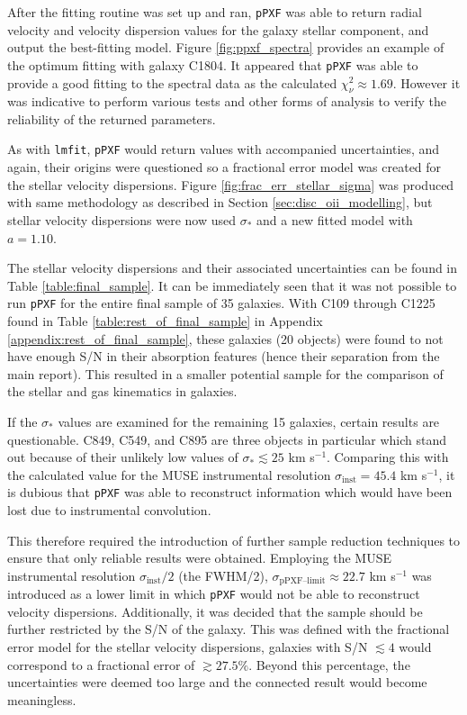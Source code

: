 \documentclass[12pt, twocolumn, nofootinbib]{revtex4-1}    %
\begin{document}
After the fitting routine was set up and ran, \texttt{pPXF} was able to return radial velocity and velocity dispersion values for the galaxy stellar component, and output the best-fitting model. Figure \ref{fig:ppxf_spectra} provides an example of the optimum fitting with galaxy C1804. It appeared that \texttt{pPXF} was able to provide a good fitting to the spectral data as the calculated $\chi^2_\nu\approx1.69$. However it was indicative to perform various tests and other forms of analysis to verify the reliability of the returned parameters. 
 
As with \texttt{lmfit}, \texttt{pPXF} would return values with accompanied uncertainties, and again, their origins were questioned so a fractional error model was created for the stellar velocity dispersions. Figure \ref{fig:frac_err_stellar_sigma} was produced with same methodology as described in Section \ref{sec:disc_oii_modelling}, but stellar velocity dispersions were now used $\sigma_*$ and a new fitted model with $a=1.10$. 

The stellar velocity dispersions and their associated uncertainties can be found in Table \ref{table:final_sample}. It can be immediately seen that it was not possible to run \texttt{pPXF} for the entire final sample of 35 galaxies. With C109 through C1225 found in Table \ref{table:rest_of_final_sample} in Appendix \ref{appendix:rest_of_final_sample}, these galaxies (20 objects) were found to not have enough S/N in their absorption features (hence their separation from the main report). This resulted in a smaller potential sample for the comparison of the stellar and gas kinematics in galaxies. 

If the $\sigma_*$ values are examined for the remaining 15 galaxies, certain results are questionable. C849, C549, and C895 are three objects in particular which stand out because of their unlikely low values of $\sigma_*\lesssim 25$ km s$^{-1}$. Comparing this with the calculated value for the MUSE instrumental resolution $\sigma_{\text{inst}}=45.4$ km s$^{-1}$, it is dubious that \texttt{pPXF} was able to reconstruct information which would have been lost due to instrumental convolution. 

This therefore required the introduction of further sample reduction techniques to ensure that only reliable results were obtained. Employing the MUSE instrumental resolution $\sigma_{\text{inst}}/2$ (the FWHM/2), $\sigma_{\text{pPXF--limit}} \approx22.7$ km s$^{-1}$ was introduced as a lower limit in which \texttt{pPXF} would not be able to reconstruct velocity dispersions. Additionally, it was decided that the sample should be further restricted by the S/N of the galaxy. This was defined with the fractional error model for the stellar velocity dispersions, galaxies with S/N $\lesssim 4$ would correspond to a fractional error of $\gtrsim 27.5\%$. Beyond this percentage, the uncertainties were deemed too large and the connected result would become meaningless. 
\end{document}
